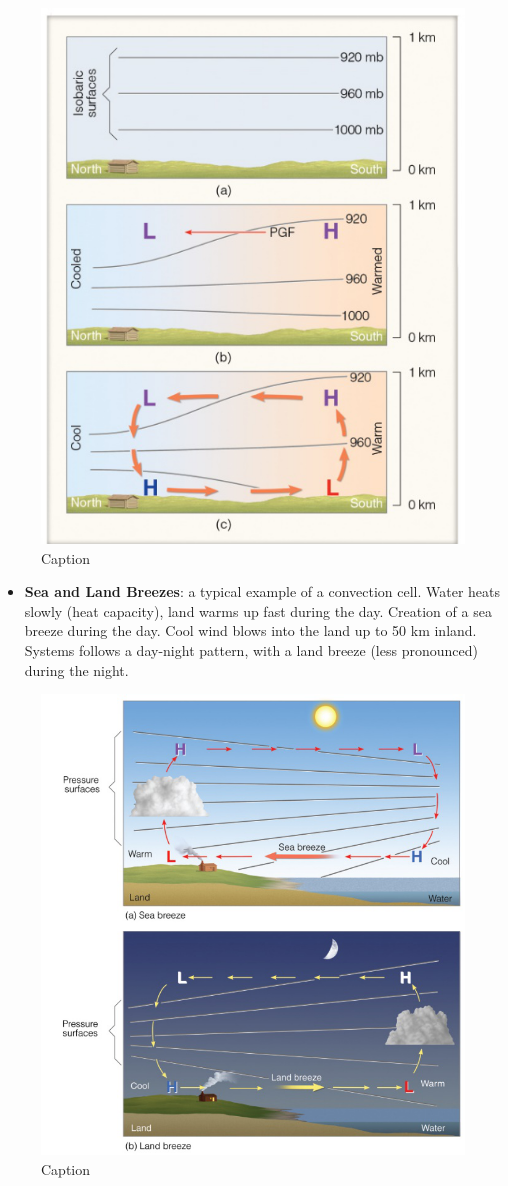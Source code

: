 \documentclass[12pt,oneside]{book}
\providecommand{\tightlist}{%
  \setlength{\itemsep}{0pt}\setlength{\parskip}{0pt}}
\begin{document}
\begin{figure}

{\centering \includegraphics[width=0.6\linewidth]{figures/Figure424} 

}

\caption{Caption}\label{fig:ThermalCirc}
\end{figure}

\begin{itemize}
\tightlist
\item
  \textbf{Sea and Land Breezes}: a typical example of a convection cell.
  Water heats slowly (heat capacity), land warms up fast during the day.
  Creation of a sea breeze during the day. Cool wind blows into the land
  up to 50 km inland. Systems follows a day-night pattern, with a land
  breeze (less pronounced) during the night.
\end{itemize}

\begin{figure}

{\centering \includegraphics[width=0.6\linewidth]{figures/Figure425} 

}

\caption{Caption}\label{fig:Breezes}
\end{figure}
\end{document}
